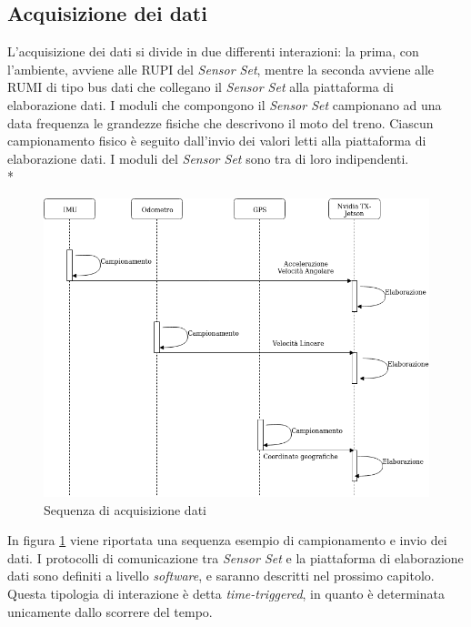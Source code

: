 	\subsection{Acquisizione dei dati}
	L'acquisizione dei dati si divide in due differenti interazioni: la prima, con l'ambiente, avviene alle RUPI del \emph{Sensor Set}, mentre la seconda avviene alle RUMI di tipo bus dati che collegano il \emph{Sensor Set} alla piattaforma di elaborazione dati.
	I moduli che compongono il \emph{Sensor Set} campionano ad una data frequenza le grandezze fisiche che descrivono il moto del treno. Ciascun campionamento fisico \`e seguito dall'invio dei valori letti alla piattaforma di elaborazione dati. I moduli del \emph{Sensor Set} sono tra di loro indipendenti.\\* 
	\begin{figure}[h]
		\centering
		\includegraphics[width=0.7\linewidth]{img/seqdiag}
		\caption{Sequenza di acquisizione dati}
		\label{fig:seqdiag}
	\end{figure}
	In figura \ref{fig:seqdiag} viene riportata una sequenza esempio di campionamento e invio dei dati. I protocolli di comunicazione tra \emph{Sensor Set} e la piattaforma di elaborazione dati sono definiti a livello \emph{software}, e saranno descritti nel prossimo capitolo.
	Questa tipologia di interazione \`e detta \emph{time-triggered}, in quanto \`e determinata unicamente dallo scorrere del tempo. \cite{timetriggered} \cite{evttimetriggered}
